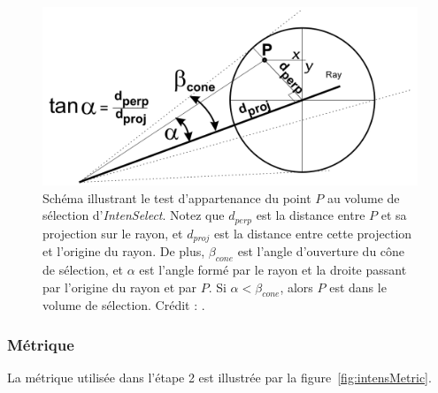	\begin{figure}[H]
		\centering
		\includegraphics[width=\textwidth]{figures/ch2/intensCone}
		\caption[\emph{IntenSelect} --- Test d'appartenance au volume de sélection]{Schéma illustrant le test d'appartenance du point $P$ au volume de sélection d'\emph{IntenSelect}. Notez que $d_{perp}$ est la distance entre $P$ et sa projection sur le rayon, et $d_{proj}$ est la distance entre cette projection et l'origine du rayon. De plus, $\beta_{cone}$ est l'angle d'ouverture du cône de sélection, et $\alpha$ est l'angle formé par le rayon et la droite passant par l'origine du rayon et par $P$. Si $\alpha < \beta_{cone}$, alors $P$ est dans le volume de sélection. Crédit : \cite{de2005intenselect}.}
		\label{fig:intensCone}
	\end{figure}
	
	\subsubsection{Métrique}
	La métrique utilisée dans l'étape 2 est illustrée par la figure~\ref{fig:intensMetric}.
	
